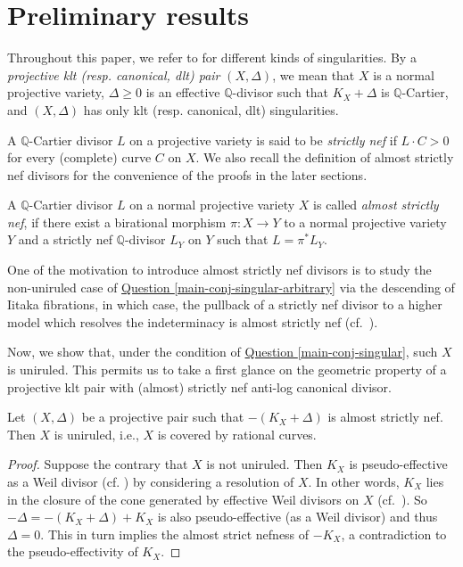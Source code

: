 \section{Preliminary results}
\label{sec_pre}
Throughout this paper, we refer to \cite[Chapter 2]{KM98} for different kinds of singularities.
By a \textit{projective klt (resp. canonical, dlt) pair} $(X,\Delta)$, we mean that $X$ is a normal projective variety, $\Delta\geqslant 0$ is an effective $\mathbb{Q}$-divisor such that $K_X+\Delta$ is $\mathbb{Q}$-Cartier, and  $(X,\Delta)$ has only klt (resp. canonical, dlt) singularities.

A $\mathbb{Q}$-Cartier divisor $L$ on a projective variety is said to be \textit{strictly nef} if $L\cdot C>0$ for every (complete) curve $C$ on $X$.
We also recall the definition of almost strictly nef divisors for the convenience of the proofs in the later sections.
\begin{defn}\label{defn-almost-sn}
A $\mathbb{Q}$-Cartier divisor $L$ on a normal projective variety $X$ is called  \textit{almost strictly nef}, if there exist a birational morphism $\pi:X\to Y$ to a  normal projective variety $Y$ and a strictly nef $\mathbb{Q}$-divisor $L_Y$ on $Y$ such that $L=\pi^*L_Y$.  
\end{defn}
One of the motivation to introduce almost strictly nef divisors is to study the  non-uniruled case of {\hyperref[main-conj-singular-arbitrary]{Question \ref*{main-conj-singular-arbitrary}}}  via the descending of Iitaka fibrations, in which case, the pullback of a strictly nef divisor to a higher model which resolves the indeterminacy is almost strictly nef  (cf.~\cite[Theorem 2.6]{CCP08}). 


Now, we show  that, under the condition of  {\hyperref[main-conj-singular]{Question \ref*{main-conj-singular}}},  such $X$ is uniruled.
This permits us to take a first glance on the geometric property of a  projective klt pair with (almost) strictly nef anti-log canonical divisor. 


\begin{prop}\label{prop_strict_uniruled}
Let $(X,\Delta)$ be a projective pair such that $-(K_X+\Delta)$ is almost strictly nef.
Then $X$ is uniruled, i.e., $X$ is covered by rational curves.	
\end{prop}
\begin{proof}
Suppose the contrary that $X$ is not uniruled.
Then $K_X$ is pseudo-effective as a Weil divisor (cf. \cite{BDPP13}) by considering a resolution of $X$.
In other words, $K_X$ lies in the closure of the cone generated by effective Weil divisors on $X$ (cf.~\cite[Definition 2.2]{MZ18}).   
So $-\Delta=-(K_X+\Delta)+K_X$ is also pseudo-effective (as a 
Weil divisor) and thus $\Delta=0$.
This in turn implies the almost strict nefness of $-K_X$, a contradiction to the pseudo-effectivity of $K_X$. 
\end{proof}




